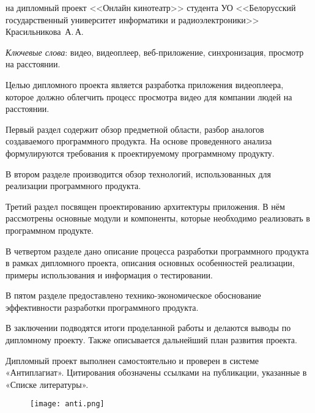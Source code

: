 \thispagestyle{empty}

\begin{center}
  \begin{minipage}{0.82\textwidth}
    на дипломный проект <<Онлайн кинотеатр>> студента УО <<Белорусский государственный университет информатики и радиоэлектроники>> Красильникова~А.\,А.
  \end{minipage}
\end{center}

\emph{Ключевые слова}: видео, видеоплеер, веб-приложение, синхронизация, просмотр на расстоянии.
\vspace{1\parsep}

Целью дипломного проекта является разработка приложения видеоплеера, которое должно облегчить процесс просмотра видео для компании людей на расстоянии.

Первый раздел содержит обзор предметной области, разбор аналогов создаваемого программного продукта. На основе проведенного анализа формулируются требования к проектируемому программному продукту.

В втором разделе производится обзор технологий, использованных для реализации программного продукта.

Третий раздел посвящен проектированию архитектуры приложения. В нём рассмотрены основные модули и компоненты, которые необходимо реализовать в программном продукте.

В четвертом разделе дано описание процесса разработки программного продукта в рамках дипломного проекта, описания основных особенностей реализации, примеры использования и информация о тестировании.

В пятом разделе предоставлено технико-экономическое обоснование эффективности разработки программного продукта.

В заключении подводятся итоги проделанной работы и делаются выводы по дипломному проекту. Также описывается дальнейший план развития проекта.

Дипломный проект выполнен самостоятельно и проверен в системе «Антиплагиат». Цитирования обозначены ссылками на публикации, указанные в «Списке литературы».
\begin{figure}[H]
  \centering
    \texttt{[image: anti.png]} 
    \label{fig:anti}
 \end{figure}
\clearpage
